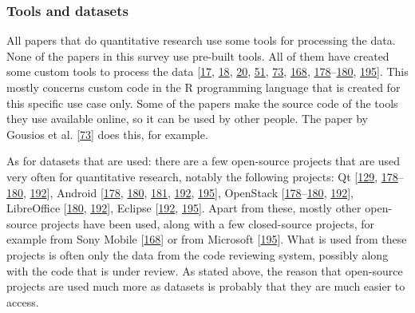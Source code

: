 \documentclass[]{book}
\begin{document}
\subsubsection{Tools and datasets}\label{tools-and-datasets}

All papers that do quantitative research use some tools for processing
the data. None of the papers in this survey use pre-built tools. All of
them have created some custom tools to process the data
{[}\protect\hyperlink{ref-baysal2016investigating}{17},
\protect\hyperlink{ref-baysal2013influence}{18},
\protect\hyperlink{ref-beller2014modern}{20},
\protect\hyperlink{ref-czerwonka2015code}{51},
\protect\hyperlink{ref-gousios2014exploratory}{73},
\protect\hyperlink{ref-shimagaki2016study}{168},
\protect\hyperlink{ref-thongtanunam2017review}{178}--\protect\hyperlink{ref-thongtanunam2015should}{180},
\protect\hyperlink{ref-zanjani2016automatically}{195}{]}. This mostly
concerns custom code in the R programming language that is created for
this specific use case only. Some of the papers make the source code of
the tools they use available online, so it can be used by other people.
The paper by Gousios et al.
{[}\protect\hyperlink{ref-gousios2014exploratory}{73}{]} does this, for
example.

As for datasets that are used: there are a few open-source projects that
are used very often for quantitative research, notably the following
projects: Qt {[}\protect\hyperlink{ref-mcintosh2014impact}{129},
\protect\hyperlink{ref-thongtanunam2017review}{178}--\protect\hyperlink{ref-thongtanunam2015should}{180},
\protect\hyperlink{ref-yang2016mining}{192}{]}, Android
{[}\protect\hyperlink{ref-thongtanunam2017review}{178},
\protect\hyperlink{ref-thongtanunam2015should}{180},
\protect\hyperlink{ref-thongtanunam2014reda}{181},
\protect\hyperlink{ref-yang2016mining}{192},
\protect\hyperlink{ref-zanjani2016automatically}{195}{]}, OpenStack
{[}\protect\hyperlink{ref-thongtanunam2017review}{178}--\protect\hyperlink{ref-thongtanunam2015should}{180},
\protect\hyperlink{ref-yang2016mining}{192}{]}, LibreOffice
{[}\protect\hyperlink{ref-thongtanunam2015should}{180},
\protect\hyperlink{ref-yang2016mining}{192}{]}, Eclipse
{[}\protect\hyperlink{ref-yang2016mining}{192},
\protect\hyperlink{ref-zanjani2016automatically}{195}{]}. Apart from
these, mostly other open-source projects have been used, along with a
few closed-source projects, for example from Sony Mobile
{[}\protect\hyperlink{ref-shimagaki2016study}{168}{]} or from Microsoft
{[}\protect\hyperlink{ref-zanjani2016automatically}{195}{]}. What is
used from these projects is often only the data from the code reviewing
system, possibly along with the code that is under review. As stated
above, the reason that open-source projects are used much more as
datasets is probably that they are much easier to access.
\end{document}
